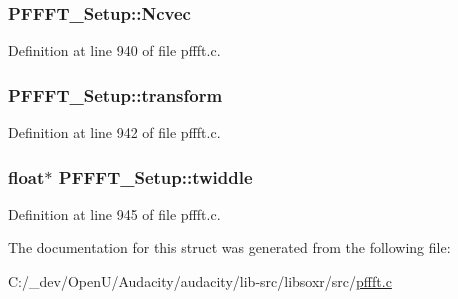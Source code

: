 \subsubsection[{\texorpdfstring{Ncvec}{Ncvec}}]{ P\+F\+F\+F\+T\+\_\+\+Setup\+::\+Ncvec}\hypertarget{struct_p_f_f_f_t___setup_abd11f546bae7f16ca052958bf000116d}{}\label{struct_p_f_f_f_t___setup_abd11f546bae7f16ca052958bf000116d}


Definition at line 940 of file pffft.\+c.

\subsubsection[{\texorpdfstring{transform}{transform}}]{ P\+F\+F\+F\+T\+\_\+\+Setup\+::transform}\hypertarget{struct_p_f_f_f_t___setup_a980def09ec15883c12689443d97a36b5}{}\label{struct_p_f_f_f_t___setup_a980def09ec15883c12689443d97a36b5}


Definition at line 942 of file pffft.\+c.

\subsubsection[{\texorpdfstring{twiddle}{twiddle}}]{\setlength{\rightskip}{0pt plus 5cm}float$\ast$ P\+F\+F\+F\+T\+\_\+\+Setup\+::twiddle}\hypertarget{struct_p_f_f_f_t___setup_acda18fead895e0d4e29bcda839bb9ccf}{}\label{struct_p_f_f_f_t___setup_acda18fead895e0d4e29bcda839bb9ccf}


Definition at line 945 of file pffft.\+c.



The documentation for this struct was generated from the following file\+:\begin{DoxyCompactItemize}
\item 
C\+:/\+\_\+dev/\+Open\+U/\+Audacity/audacity/lib-\/src/libsoxr/src/\hyperlink{pffft_8c}{pffft.\+c}\end{DoxyCompactItemize}
